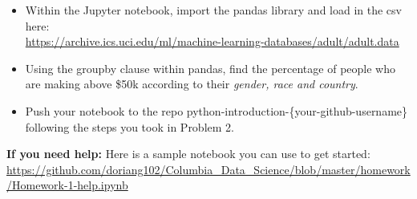 \documentclass[paper=a4, fontsize=11pt]{scrartcl} %
\numberwithin{equation}{section} %
\numberwithin{figure}{section} %
\numberwithin{table}{section} %
\begin{document}
\begin{itemize}
\item Within the Jupyter notebook, import the pandas library and load in the csv here:\\ \url{https://archive.ics.uci.edu/ml/machine-learning-databases/adult/adult.data}
\item Using the groupby clause within pandas, find the percentage of people who are making above \$50k according to their \emph{gender, race and country}.
\item Push your notebook to the repo python-introduction-\{your-github-username\}  following the steps you took in Problem 2. 
\end{itemize}

\textbf{If you need help:} Here is a sample notebook you can use to get started: \url{https://github.com/doriang102/Columbia_Data_Science/blob/master/homework/Homework-1-help.ipynb}
\end{document}
